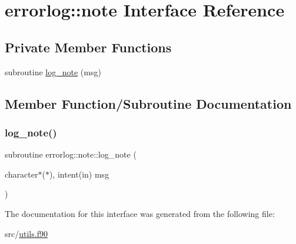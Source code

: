 \hypertarget{interfaceerrorlog_1_1note}{}\section{errorlog\+:\+:note Interface Reference}
\label{interfaceerrorlog_1_1note}
\subsection*{Private Member Functions}
\begin{DoxyCompactItemize}
\item 
subroutine \hyperlink{interfaceerrorlog_1_1note_aa49c2510a1989560136e63ce516d1f10}{log\+\_\+note} (msg)
\end{DoxyCompactItemize}


\subsection{Member Function/\+Subroutine Documentation}
\mbox{\label{interfaceerrorlog_1_1note_aa49c2510a1989560136e63ce516d1f10}} 
\subsubsection{\texorpdfstring{log\+\_\+note()}{log\_note()}}
{\footnotesize\ttfamily subroutine errorlog\+::note\+::log\+\_\+note (\begin{DoxyParamCaption}\item[{character$\ast$($\ast$), intent(in)}]{msg }\end{DoxyParamCaption})\hspace{0.3cm}{\ttfamily [private]}}



The documentation for this interface was generated from the following file\+:\begin{DoxyCompactItemize}
\item 
src/\hyperlink{utils_8f90}{utils.\+f90}\end{DoxyCompactItemize}
